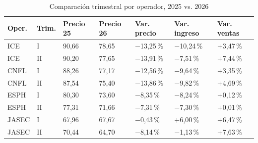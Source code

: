 \begin{table}[htbp]
\caption{Comparaci\'on trimestral por operador, 2025 vs. 2026}
\label{tab:trimestral}
\centering
\scriptsize
\renewcommand{\arraystretch}{1.15}
\begin{tabular}{@{}p{0.9cm} p{0.5cm} p{0.85cm} p{0.85cm} p{1.05cm} p{1.1cm} p{1.05cm}@{}}
\hline
\textbf{Oper.} & \textbf{Trim.} & \textbf{Precio 25} & \textbf{Precio 26} & \textbf{Var. precio} & \textbf{Var. ingreso} & \textbf{Var. ventas} \\
\hline
ICE & I & 90,66 & 78,65 & $-$13,25\,\% & $-$10,24\,\% & $+$3,47\,\% \\
ICE & II & 90,20 & 77,65 & $-$13,91\,\% & $-$7,51\,\% & $+$7,44\,\% \\
CNFL & I & 88,26 & 77,17 & $-$12,56\,\% & $-$9,64\,\% & $+$3,35\,\% \\
CNFL & II & 87,54 & 75,40 & $-$13,86\,\% & $-$9,82\,\% & $+$4,69\,\% \\
ESPH & I & 80,30 & 73,60 & $-$8,35\,\% & $-$8,24\,\% & $+$0,12\,\% \\
ESPH & II & 77,31 & 71,66 & $-$7,31\,\% & $-$7,30\,\% & $+$0,01\,\% \\
JASEC & I & 67,96 & 67,67 & $-$0,43\,\% & $+$6,00\,\% & $+$6,47\,\% \\
JASEC & II & 70,44 & 64,70 & $-$8,14\,\% & $-$1,13\,\% & $+$7,63\,\% \\
\hline
\end{tabular}
\end{table}
\FloatBarrier
